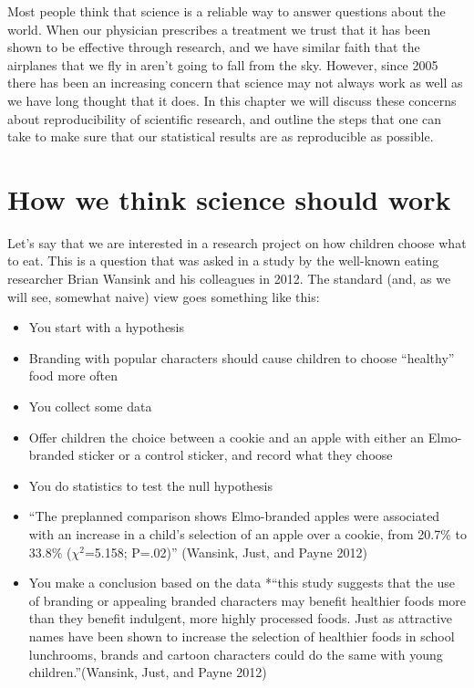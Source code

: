 \documentclass[]{book}
\providecommand{\tightlist}{%
  \setlength{\itemsep}{0pt}\setlength{\parskip}{0pt}}
\theoremstyle{definition}
\theoremstyle{definition}
\theoremstyle{definition}
\theoremstyle{remark}
\begin{document}
Most people think that science is a reliable way to answer questions
about the world. When our physician prescribes a treatment we trust that
it has been shown to be effective through research, and we have similar
faith that the airplanes that we fly in aren't going to fall from the
sky. However, since 2005 there has been an increasing concern that
science may not always work as well as we have long thought that it
does. In this chapter we will discuss these concerns about
reproducibility of scientific research, and outline the steps that one
can take to make sure that our statistical results are as reproducible
as possible.

\section{How we think science should
work}\label{how-we-think-science-should-work}

Let's say that we are interested in a research project on how children
choose what to eat. This is a question that was asked in a study by the
well-known eating researcher Brian Wansink and his colleagues in 2012.
The standard (and, as we will see, somewhat naive) view goes something
like this:

\begin{itemize}
\tightlist
\item
  You start with a hypothesis
\item
  Branding with popular characters should cause children to choose
  ``healthy'' food more often
\item
  You collect some data
\item
  Offer children the choice between a cookie and an apple with either an
  Elmo-branded sticker or a control sticker, and record what they choose
\item
  You do statistics to test the null hypothesis
\item
  ``The preplanned comparison shows Elmo-branded apples were associated
  with an increase in a child's selection of an apple over a cookie,
  from 20.7\% to 33.8\% (\(\chi^2\)=5.158; P=.02)'' (Wansink, Just, and
  Payne 2012)
\item
  You make a conclusion based on the data *``this study suggests that
  the use of branding or appealing branded characters may benefit
  healthier foods more than they benefit indulgent, more highly
  processed foods. Just as attractive names have been shown to increase
  the selection of healthier foods in school lunchrooms, brands and
  cartoon characters could do the same with young children.''(Wansink,
  Just, and Payne 2012)
\end{itemize}
\end{document}
